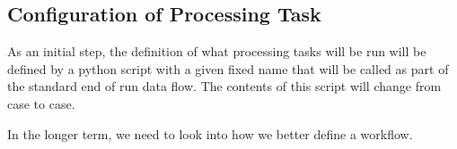 \subsection{Configuration of Processing Task}

As an initial step, the definition of what processing tasks will be run will be defined by a python script with a given fixed name that will be called as part of the standard end of run data flow.  The contents of this script will change from case to case.

In the longer term, we need to look into how we better define a workflow.
